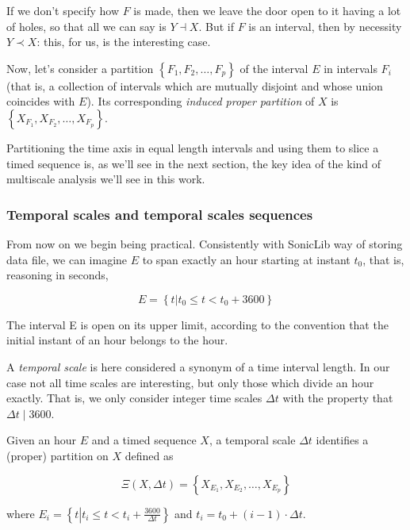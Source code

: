 \documentclass[a4paper,10pt]{book}
\begin{document}
If we don't specify how $F$ is made, then we leave the door open to it having a lot of holes, so that all we can say is $Y \dashv X$. But if $F$ is an interval, then by necessity $Y \prec X$: this, for us, is the interesting case.

Now, let's consider a partition $\left\{F_{1}, F_{2}, \ldots, F_{p}\right\}$ of the interval $E$ in intervals $F_{i}$ (that is, a collection of intervals which are mutually disjoint and whose union coincides with $E$). Its corresponding \emph{induced proper partition} of $X$ is $\left\{X_{F_{1}}, X_{F_{2}}, \ldots, X_{F_{p}}\right\}$.

Partitioning the time axis in equal length intervals and using them to slice a timed sequence is, as we'll see in the next section, the key idea of the kind of multiscale analysis we'll see in this work.


\subsubsection{Temporal scales and temporal scales sequences}

From now on we begin being practical. Consistently with SonicLib way of storing data file, we can imagine $E$ to span exactly an hour starting at instant $t_{0}$, that is, reasoning in seconds,

\begin{equation}\label{eq:An hour}
	E = \left\{t \left| t_{0} \le t < t_{0}+3600 \right.\right\}
\end{equation}

\noindent The interval E is open on its upper limit, according to the convention that the initial instant of an hour belongs to the hour.

A \emph{temporal scale} is here considered a synonym of a time interval length. In our case not all time scales are interesting, but only those which divide an hour exactly. That is, we only consider integer time scales $\Delta t$ with the property that $\Delta t \mid 3600$.

Given an hour $E$ and a timed sequence $X$, a temporal scale $\Delta t$ identifies a (proper) partition on $X$ defined as

\begin{equation}\label{eq:Partition induced on X by a time scale}
	\Xi(X,\Delta t) = \left\{X_{E_{1}}, X_{E_{2}}, \ldots, X_{E_{p}}\right\}
\end{equation}

\noindent where $E_{i} = \left\{t \left| t_{i} \le t < t_{i} + \frac{3600}{\Delta t}\right.\right\}$ and $t_{i} = t_{0} + \left(i-1\right) \cdot \Delta t$.
\end{document}
